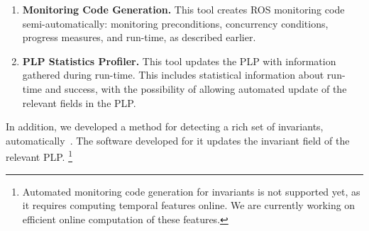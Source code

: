\documentclass[letterpaper]{article}
\begin{document}
{\begin{enumerate}
\item {\bf Monitoring Code Generation.} This tool creates
ROS monitoring code semi-automatically: monitoring preconditions, concurrency conditions, progress measures, and run-time, as described earlier. 

\item {\bf PLP Statistics Profiler.}
This tool updates the PLP with information gathered during run-time.
This includes statistical information about run-time and success, with the possibility of allowing automated update of the relevant fields in the PLP.
\end{enumerate}
In addition, we  developed a method for detecting a rich set of invariants, automatically~\citep{MatanThesis}. The software developed for it updates the invariant field of the relevant PLP.%
\footnote{Automated monitoring code generation for invariants is not supported yet, as it requires computing temporal features online. We are currently working on efficient online computation of these features.}
} %




\end{document}
